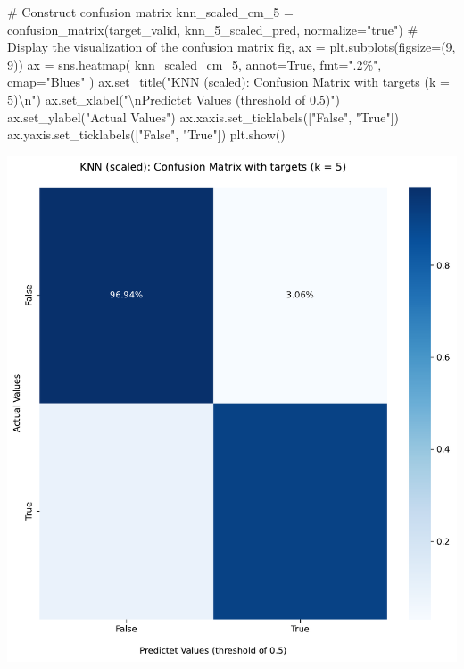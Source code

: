 \documentclass[
  11pt,
  letterpaper,
  DIV=11,
  numbers=noendperiod]{scrartcl}
\newenvironment{Shaded}{\begin{snugshade}}{\end{snugshade}}
\newcommand{\CharTok}[1]{\textcolor[rgb]{0.13,0.47,0.30}{#1}}
\newcommand{\CommentTok}[1]{\textcolor[rgb]{0.37,0.37,0.37}{#1}}
\newcommand{\DecValTok}[1]{\textcolor[rgb]{0.68,0.00,0.00}{#1}}
\newcommand{\NormalTok}[1]{\textcolor[rgb]{0.00,0.23,0.31}{#1}}
\newcommand{\OperatorTok}[1]{\textcolor[rgb]{0.37,0.37,0.37}{#1}}
\newcommand{\StringTok}[1]{\textcolor[rgb]{0.13,0.47,0.30}{#1}}
\newcommand{\VariableTok}[1]{\textcolor[rgb]{0.07,0.07,0.07}{#1}}
\begin{document}
\begin{Shaded}
\begin{Highlighting}[]
\CommentTok{\# Construct confusion matrix}
\NormalTok{knn\_scaled\_cm\_5 }\OperatorTok{=}\NormalTok{ confusion\_matrix(target\_valid, knn\_5\_scaled\_pred, normalize}\OperatorTok{=}\StringTok{"true"}\NormalTok{)}
\CommentTok{\# Display the visualization of the confusion matrix}
\NormalTok{fig, ax }\OperatorTok{=}\NormalTok{ plt.subplots(figsize}\OperatorTok{=}\NormalTok{(}\DecValTok{9}\NormalTok{, }\DecValTok{9}\NormalTok{))}
\NormalTok{ax }\OperatorTok{=}\NormalTok{ sns.heatmap(}
\NormalTok{knn\_scaled\_cm\_5, annot}\OperatorTok{=}\VariableTok{True}\NormalTok{, fmt}\OperatorTok{=}\StringTok{".2\%"}\NormalTok{, cmap}\OperatorTok{=}\StringTok{"Blues"}
\NormalTok{)}
\NormalTok{ax.set\_title(}\StringTok{"KNN (scaled): Confusion Matrix with targets (k = 5)}\CharTok{\textbackslash{}n}\StringTok{"}\NormalTok{)}
\NormalTok{ax.set\_xlabel(}\StringTok{"}\CharTok{\textbackslash{}n}\StringTok{Predictet Values (threshold of 0.5)"}\NormalTok{)}
\NormalTok{ax.set\_ylabel(}\StringTok{"Actual Values"}\NormalTok{)}
\NormalTok{ax.xaxis.set\_ticklabels([}\StringTok{"False"}\NormalTok{, }\StringTok{"True"}\NormalTok{])}
\NormalTok{ax.yaxis.set\_ticklabels([}\StringTok{"False"}\NormalTok{, }\StringTok{"True"}\NormalTok{])}
\NormalTok{plt.show()}
\end{Highlighting}
\end{Shaded}

\includegraphics{mp2_files/figure-pdf/cell-19-output-1.pdf}
\end{document}
